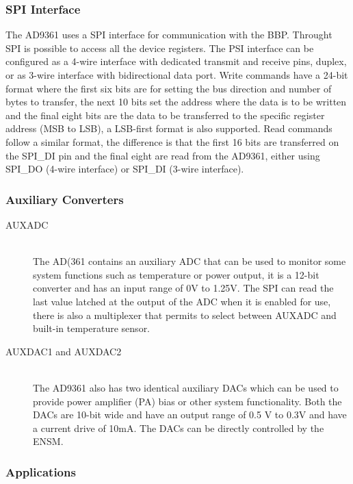 \subsubsection{SPI Interface}

The AD9361 uses a SPI interface for communication with the BBP. Throught SPI is
possible to access all the device registers. The PSI interface can be configured
as a 4-wire interface with dedicated transmit and receive pins, duplex, or as
3-wire interface with bidirectional data port. Write commands have a 24-bit
format where the first six bits are for setting the bus direction and number of
bytes to transfer, the next 10 bits set the address where the data is to be
written and the final eight bits are the data to be transferred to the specific
register address (MSB to LSB), a LSB-first format is also supported. Read
commands follow a similar format, the difference is that the first 16 bits are
transferred on the SPI\_DI pin and the final eight are read from the AD9361,
either using SPI\_DO (4-wire interface) or SPI\_DI (3-wire interface).

\subsubsection{Auxiliary Converters}

\begin{description}

	\item[AUXADC] \hfill \\
	The AD(361 contains an auxiliary ADC that can be used to monitor some system
functions such as temperature or power output, it is a 12-bit converter and has
an input range of 0V to 1.25V. The SPI can read the last value latched at the
output of the ADC when it is enabled for use, there is also a multiplexer that
permits to select between AUXADC and built-in temperature sensor.

	\item[AUXDAC1 and AUXDAC2] \hfill \\
	The AD9361 also has two identical auxiliary DACs which can be used to provide
power amplifier (PA) bias or other system functionality. Both the DACs are
10-bit wide and have an output range of 0.5 V to 0.3V and have a current drive
of 10mA. The DACs can be directly controlled by the ENSM.
\end{description}

\subsubsection{Applications}


